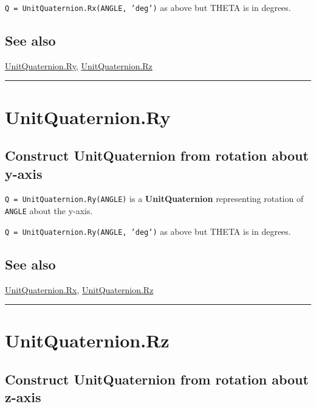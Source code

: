 \texttt{Q = UnitQuaternion.Rx(ANGLE, 'deg')} as above but THETA is in degrees.


\subsection*{See also}


\hyperlink{UnitQuaternion.Ry}{\color{blue} UnitQuaternion.Ry}, \hyperlink{UnitQuaternion.Rz}{\color{blue} UnitQuaternion.Rz}

\vspace{1.5ex}\hrule

\hypertarget{UnitQuaternion.Ry}{\section*{UnitQuaternion.Ry}}
\subsection*{Construct UnitQuaternion from rotation about y-axis}


\texttt{Q = UnitQuaternion.Ry(ANGLE)} is a \textbf{\color{red} UnitQuaternion} representing rotation of \texttt{ANGLE} about the y-axis.



\texttt{Q = UnitQuaternion.Ry(ANGLE, 'deg')} as above but THETA is in degrees.


\subsection*{See also}


\hyperlink{UnitQuaternion.Rx}{\color{blue} UnitQuaternion.Rx}, \hyperlink{UnitQuaternion.Rz}{\color{blue} UnitQuaternion.Rz}

\vspace{1.5ex}\hrule

\hypertarget{UnitQuaternion.Rz}{\section*{UnitQuaternion.Rz}}
\subsection*{Construct UnitQuaternion from rotation about z-axis}


